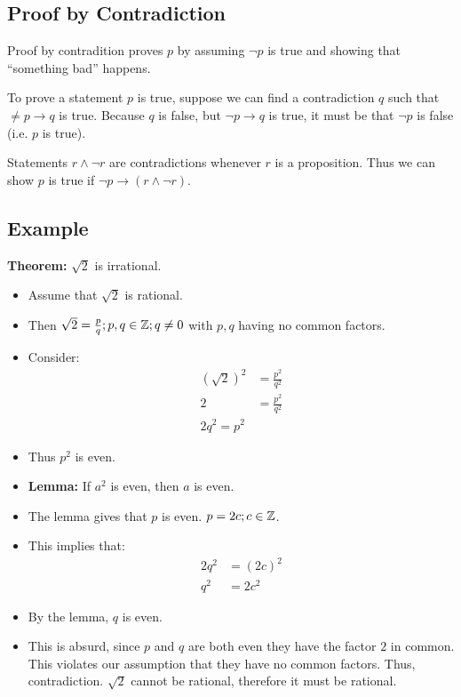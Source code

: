 \documentclass[letterpaper, 12pt]{math}
\begin{document}
\subsection*{Proof by Contradiction}
Proof by contradition proves \( p \) by assuming \( \neg{p} \) is true and
showing that ``something bad'' happens. \par
To prove a statement \( p \) is true, suppose we can find a contradiction
\( q \) such that \( \neq{p} \to q \) is true. Because \( q \) is false,
but \( \neg{p} \to q \) is true, it must be that \( \neg{p} \) is false
(i.e. \( p \) is true). \par
Statements \( r \wedge \neg{r} \) are contradictions whenever \( r \) is a
proposition. Thus we can show \( p \) is true if \( \neg{p} \to
(r \wedge \neg{r}) \).

\subsection*{Example}
\textbf{Theorem:} \( \sqrt{2} \) is irrational.
\begin{itemize}
  \item Assume that \( \sqrt{2} \) is rational.
  \item Then \( \sqrt{2} = \frac{p}{q}; p,q \in \mathbb{Z}; q \neq 0 \) with \( p,q \)
    having no common factors.
  \item Consider:
    \begin{align*}
      (\sqrt{2})^{2} &= \frac{p^{2}}{q^{2}} \\
      2 &= \frac{p^{2}}{q^{2}} \\
      2q^{2} = p^{2}
    \end{align*}
  \item Thus \( p^{2} \) is even.
  \item \textbf{Lemma:} If \( a^{2} \) is even, then \( a \) is even.
  \item The lemma gives that \( p \) is even. \( p = 2c; c \in \mathbb{Z} \).
  \item This implies that:
    \begin{align*}
      2q^{2} &= (2c)^{2} \\
      q^{2} &= 2c^{2}
    \end{align*}
  \item By the lemma, \( q \) is even.
  \item This is absurd, since \( p \) and \( q \) are both even they have
    the factor \( 2 \) in common. This violates our assumption that they
    have no common factors. Thus, contradiction. \( \sqrt{2} \) cannot be
    rational, therefore it must be rational.
\end{itemize}
\end{document}
